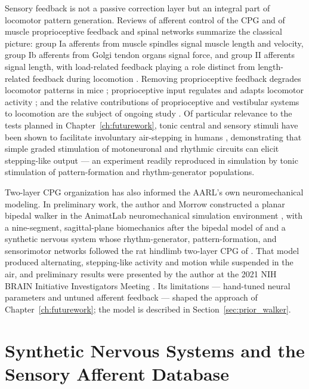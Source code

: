 Sensory feedback is not a passive correction layer but an integral part of locomotor pattern generation. Reviews of afferent control of the CPG \citep{van_de_crommert_review_1998} and of muscle proprioceptive feedback and spinal networks \citep{windhorst_muscle_2007, windhorst_spinal_2022} summarize the classical picture: group Ia afferents from muscle spindles signal muscle length and velocity, group Ib afferents from Golgi tendon organs signal force, and group II afferents signal length, with load-related feedback playing a role distinct from length-related feedback during locomotion \citep{dietz_significance_2000}. Removing proprioceptive feedback degrades locomotor patterns in mice \citep{akay_degradation_2014}; proprioceptive input regulates and adapts locomotor activity \citep{lam_role_2002}; and the relative contributions of proprioceptive and vestibular systems to locomotion are the subject of ongoing study \citep{akay_relative_2021, akay_sensory_2020}. Of particular relevance to the tests planned in Chapter~\ref{ch:futurework}, tonic central and sensory stimuli have been shown to facilitate involuntary air-stepping in humans \citep{selionov_tonic_2009}, demonstrating that simple graded stimulation of motoneuronal and rhythmic circuits can elicit stepping-like output --- an experiment readily reproduced in simulation by tonic stimulation of pattern-formation and rhythm-generator populations.

Two-layer CPG organization has also informed the AARL's own neuromechanical modeling. In preliminary work, the author and Morrow constructed a planar bipedal walker in the AnimatLab neuromechanical simulation environment \citep{cofer_animatlab_2010}, with a nine-segment, sagittal-plane biomechanics after the bipedal model of \citet{li_bipedal_2017} and a synthetic nervous system whose rhythm-generator, pattern-formation, and sensorimotor networks followed the rat hindlimb two-layer CPG of \citet{deng_neuromechanical_2019}. That model produced alternating, stepping-like activity and motion while suspended in the air, and preliminary results were presented by the author at the 2021 NIH BRAIN Initiative Investigators Meeting \citep{bolenTorqueValuesArtificialKnee2021June15-17}. Its limitations --- hand-tuned neural parameters and untuned afferent feedback --- shaped the approach of Chapter~\ref{ch:futurework}; the model is described in Section~\ref{sec:prior_walker}.

\section{Synthetic Nervous Systems and the Sensory Afferent Database}\label{sec:bg_sns}

